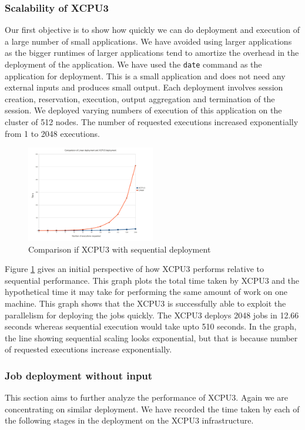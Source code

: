 \documentclass[conference]{IEEEtran}
\begin{document}
\subsubsection{Scalability of XCPU3}
Our first objective is to show how quickly we can do deployment and execution
of a large number of small applications. We have avoided using larger
applications as the bigger runtimes of larger applications tend to amortize the
overhead in the deployment of the application.  We have used the \texttt{date}
command as the application for deployment.  This is a small application and does
not need any external inputs and produces small output. Each deployment involves
session creation, reservation, execution, output aggregation and termination
of the session.  We deployed varying numbers of execution of this application on
the cluster of 512 nodes.  The number of requested executions increased
exponentially from 1 to 2048 executions.

\begin{figure}[h]
  \begin{center}
    \leavevmode
      \includegraphics[height=0.2\textheight,width=0.5\textwidth]
		{./img/linear}
    \caption{Comparison if XCPU3 with sequential deployment}
    \label{fig:sequential}
  \end{center}
\end{figure}

Figure \ref{fig:sequential} gives an initial perspective of how XCPU3 performs
relative to sequential performance.  This graph plots the total time taken by
XCPU3 and the hypothetical time it may take for performing the same amount of
work on one machine.  This graph shows that the XCPU3 is successfully able to
exploit the parallelism for deploying the jobs quickly. The XCPU3 deploys 2048
jobs in 12.66 seconds whereas sequential execution would take upto 510 seconds.
In the graph, the line showing sequential scaling looks exponential, but that is
because number of requested executions increase exponentially.


\subsubsection{Job deployment without input}
This section aims to further analyze the performance of XCPU3.  Again we are 
concentrating on similar deployment.  We have recorded the time taken by each
of the following stages in the deployment on the XCPU3 infrastructure.
\end{document}
